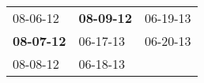 \begin{supertabular}{p{0.33\columnwidth}p{0.33\columnwidth}p{0.33\columnwidth}}
          08-06-12\textsuperscript{} &  \textbf{08-09-12\textsuperscript{}} &  06-19-13\textsuperscript{} \\
 \textbf{08-07-12\textsuperscript{}} &           06-17-13\textsuperscript{} &  06-20-13\textsuperscript{} \\
          08-08-12\textsuperscript{} &           06-18-13\textsuperscript{} &                             \\
\end{supertabular}
